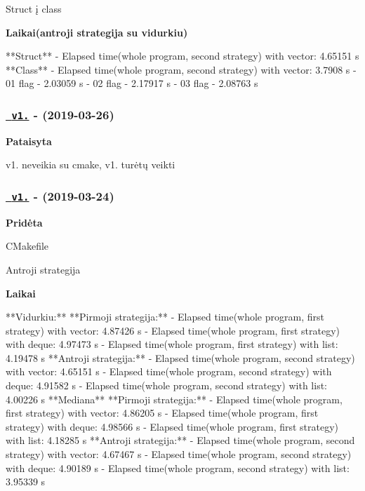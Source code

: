 \begin{DoxyItemize}
\item Struct į class
\end{DoxyItemize}

{\bfseries{Laikai(antroji strategija su vidurkiu)}} \begin{DoxyVerb}**Struct**
- Elapsed time(whole program, second strategy) with vector: 4.65151 s
**Class**
- Elapsed time(whole program, second strategy) with vector: 3.7908 s
- 01 flag - 2.03059 s
- 02 flag - 2.17917 s
- 03 flag - 2.08763 s
\end{DoxyVerb}


\subsubsection*{\href{https://github.com/ToNyHasK/VUObjektinisNO2/releases/tag/v1.1}{\texttt{ v1.}} -\/ (2019-\/03-\/26)}

{\bfseries{Pataisyta}}


\begin{DoxyItemize}
\item v1. neveikia su cmake, v1. turėtų veikti
\end{DoxyItemize}

\subsubsection*{\href{https://github.com/ToNyHasK/VUObjektinisNO2/releases/tag/v1.0}{\texttt{ v1.}} -\/ (2019-\/03-\/24)}

{\bfseries{Pridėta}}


\begin{DoxyItemize}
\item C\+Makefile
\item Antroji strategija
\end{DoxyItemize}

{\bfseries{Laikai}} \begin{DoxyVerb}**Vidurkiu:**
    **Pirmoji strategija:**
        - Elapsed time(whole program, first strategy) with vector: 4.87426 s
        - Elapsed time(whole program, first strategy) with deque: 4.97473 s
        - Elapsed time(whole program, first strategy) with list: 4.19478 s
    **Antroji strategija:**
        - Elapsed time(whole program, second strategy) with vector: 4.65151 s
        - Elapsed time(whole program, second strategy) with deque: 4.91582 s
        - Elapsed time(whole program, second strategy) with list: 4.00226 s
**Mediana**
    **Pirmoji strategija:**
        - Elapsed time(whole program, first strategy) with vector: 4.86205 s
        - Elapsed time(whole program, first strategy) with deque: 4.98566 s
        - Elapsed time(whole program, first strategy) with list: 4.18285 s
    **Antroji strategija:**
        - Elapsed time(whole program, second strategy) with vector: 4.67467 s
        - Elapsed time(whole program, second strategy) with deque: 4.90189 s
        - Elapsed time(whole program, second strategy) with list: 3.95339 s
\end{DoxyVerb}


